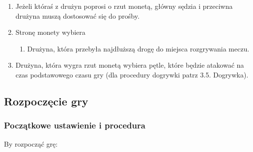 \documentclass[12pt]{article}
\begin{document}
\begin{enumerate}
	\item
	      Jeżeli któraś z drużyn poprosi o rzut monetą, główny sędzia i
	      przeciwna drużyna muszą dostosować się do prośby.
	\item
	      Stronę monety wybiera

	      \begin{enumerate}
		      \item
		            Drużyna, która przebyła najdłuższą drogę do miejsca rozgrywania
		            meczu.
	      \end{enumerate}
	\item
	      Drużyna, która wygra rzut monetą wybiera pętle, które będzie atakować
	      na czas podstawowego czasu gry (dla procedury dogrywki patrz 3.5.
	      Dogrywka).
\end{enumerate}

\subsection{Rozpoczęcie gry}

\subsubsection{Początkowe ustawienie i procedura}
By rozpocząć grę:
\end{document}
